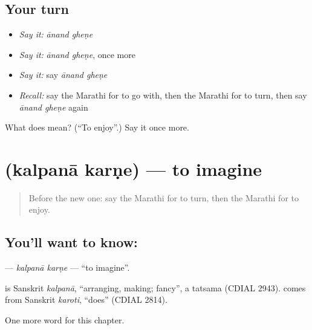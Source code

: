 \subsection*{Your turn}
\begin{itemize}
\raggedright
  \item \emph{Say it:} \emph{ānand gheṇe}
  \item \emph{Say it:} \emph{ānand gheṇe}, once more
  \item \emph{Say it:} say \emph{ānand gheṇe}
  \item \emph{Recall:} say the Marathi for to go with, then the Marathi for to turn, then say \emph{ānand gheṇe} again
\end{itemize}

\begin{tcolorbox}[breakable,colback=teal!4,colframe=teal!35!black,title={Before you move on}]
What does   mean? (\textquotedblleft{}To enjoy\textquotedblright{}.) Say it once more.
\end{tcolorbox}
\section[\texorpdfstring{\mr{कल्पना} \mr{करणे} (kalpanā karṇe)}{कल्पना करणे (kalpanā karṇe)}]{  (kalpanā karṇe) — to imagine}

\label{lesson:MR-C253-kalpana-karne}



\begin{quote}
Before the new one: say the Marathi for to turn, then the Marathi for to enjoy.
\end{quote}

\subsection*{You'll want to know:  }
\textbf{ } — \emph{kalpanā karṇe} — \textquotedblleft{}to imagine\textquotedblright{}.

\begin{cousinweb}
\textbf{} is Sanskrit \emph{kalpanā}, \textquotedblleft{}arranging, making; fancy\textquotedblright{}, a tatsama (CDIAL 2943). \textbf{} comes from Sanskrit \emph{karoti}, \textquotedblleft{}does\textquotedblright{} (CDIAL 2814).
\end{cousinweb}

\begin{grammarlens}[title={What you've built}]
One more word for this chapter.
\end{grammarlens}

